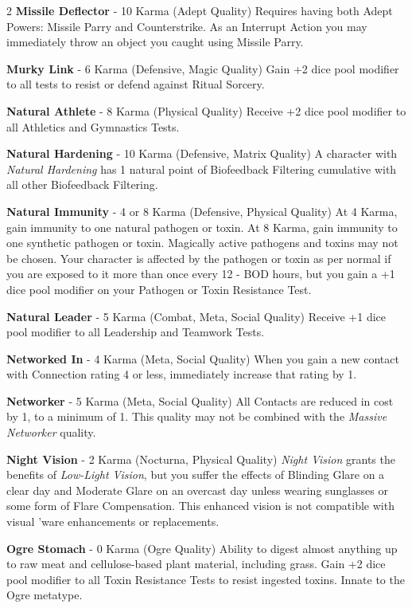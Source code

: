 \documentclass[
  oneside]{article}
\begin{document}
\begin{multicols}{2}
\textbf{Missile Deflector} - 10 Karma (Adept
Quality) Requires having both Adept Powers:
Missile Parry and Counterstrike. As an Interrupt
Action you may immediately throw an object you
caught using Missile Parry.

\textbf{Murky Link} - 6 Karma (Defensive, Magic
Quality) Gain +2 dice pool modifier to all tests
to resist or defend against Ritual Sorcery.

\textbf{Natural Athlete} - 8 Karma (Physical
Quality) Receive +2 dice pool modifier to all
Athletics and Gymnastics Tests.

\textbf{Natural Hardening} - 10 Karma (Defensive,
Matrix Quality) A character with \emph{Natural
Hardening} has 1 natural point of Biofeedback
Filtering cumulative with all other Biofeedback
Filtering.

\textbf{Natural Immunity} - 4 or 8 Karma
(Defensive, Physical Quality) At 4 Karma, gain
immunity to one natural pathogen or toxin. At 8
Karma, gain immunity to one synthetic pathogen or
toxin. Magically active pathogens and toxins may
not be chosen. Your character is affected by the
pathogen or toxin as per normal if you are exposed
to it more than once every 12 - BOD hours, but you
gain a +1 dice pool modifier on your Pathogen or
Toxin Resistance Test.

\textbf{Natural Leader} - 5 Karma (Combat, Meta,
Social Quality) Receive +1 dice pool modifier to
all Leadership and Teamwork Tests.

\textbf{Networked In} - 4 Karma (Meta, Social
Quality) When you gain a new contact with
Connection rating 4 or less, immediately increase
that rating by 1.

\textbf{Networker} - 5 Karma (Meta, Social
Quality) All Contacts are reduced in cost by 1, to
a minimum of 1. This quality may not be combined
with the \emph{Massive Networker} quality.

\textbf{Night Vision} - 2 Karma (Nocturna,
Physical Quality) \emph{Night Vision} grants the
benefits of \emph{Low-Light Vision}, but you
suffer the effects of Blinding Glare on a clear
day and Moderate Glare on an overcast day unless
wearing sunglasses or some form of Flare
Compensation. This enhanced vision is not
compatible with visual 'ware enhancements or
replacements.

\textbf{Ogre Stomach} - 0 Karma (Ogre Quality)
Ability to digest almost anything up to raw meat
and cellulose-based plant material, including
grass. Gain +2 dice pool modifier to all Toxin
Resistance Tests to resist ingested toxins. Innate
to the Ogre metatype.


\end{multicols}
\end{document}
